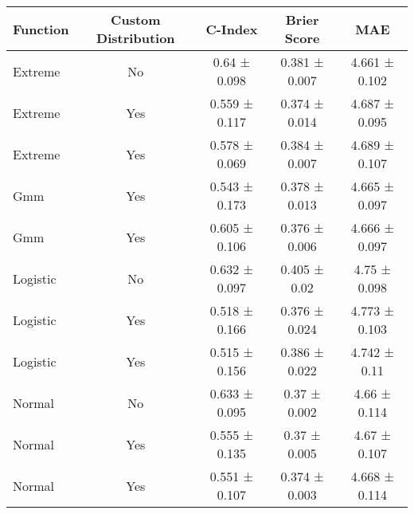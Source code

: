 \begin{tabular}{lcccc}
\toprule
Function & Custom Distribution & C-Index & Brier Score & MAE \\
\midrule
Extreme & No & 0.64 ± 0.098 & 0.381 ± 0.007 & 4.661 ± 0.102 \\
Extreme & Yes & 0.559 ± 0.117 & 0.374 ± 0.014 & 4.687 ± 0.095 \\
Extreme & Yes & 0.578 ± 0.069 & 0.384 ± 0.007 & 4.689 ± 0.107 \\
Gmm & Yes & 0.543 ± 0.173 & 0.378 ± 0.013 & 4.665 ± 0.097 \\
Gmm & Yes & 0.605 ± 0.106 & 0.376 ± 0.006 & 4.666 ± 0.097 \\
Logistic & No & 0.632 ± 0.097 & 0.405 ± 0.02 & 4.75 ± 0.098 \\
Logistic & Yes & 0.518 ± 0.166 & 0.376 ± 0.024 & 4.773 ± 0.103 \\
Logistic & Yes & 0.515 ± 0.156 & 0.386 ± 0.022 & 4.742 ± 0.11 \\
Normal & No & 0.633 ± 0.095 & 0.37 ± 0.002 & 4.66 ± 0.114 \\
Normal & Yes & 0.555 ± 0.135 & 0.37 ± 0.005 & 4.67 ± 0.107 \\
Normal & Yes & 0.551 ± 0.107 & 0.374 ± 0.003 & 4.668 ± 0.114 \\
\bottomrule
\end{tabular}

